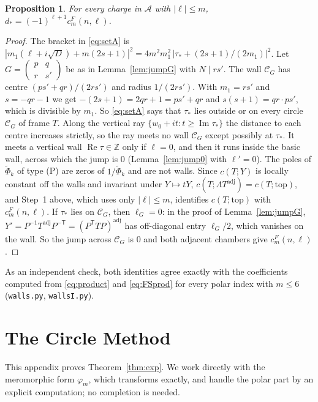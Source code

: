 \documentclass[11pt]{amsart}
\numberwithin{equation}{section}
\theoremstyle{plain}
\newtheorem{prop}[thm]{Proposition}
\theoremstyle{definition}
\theoremstyle{remark}
\newcommand{\Z}{\mathbb{Z}}
\newcommand{\cA}{\mathcal{A}}
\newcommand{\tPhi}{\widetilde{\Phi}}
\newcommand{\sm}[4]{\left(\begin{smallmatrix}#1&#2\\#3&#4\end{smallmatrix}\right)}
\begin{document}
\begin{prop}\label{prop:dstarA}
For every charge in $\cA$ with $|\ell|\le m$, $d_*=(-1)^{\ell+1}c^F_m(n,\ell)$.
\end{prop}

\begin{proof}
The bracket in \eqref{eq:setA} is $|m_1(\ell+i\sqrt D)+m(2s+1)|^2=4m^2m_1^2\,|\tau_*+(2s+1)/(2m_1)|^2$. Let $G=\sm pq{r}{s'}$ be as in Lemma~\ref{lem:jumpG} with $N\mid rs'$. The wall $\mathcal C_G$ has centre $(ps'+qr)/(2rs')$ and radius $1/(2rs')$. With $m_1=rs'$ and $s=-qr-1$ we get $-(2s+1)=2qr+1=ps'+qr$ and $s(s+1)=qr\cdot ps'$, which is divisible by $m_1$. So \eqref{eq:setA} says that $\tau_*$ lies outside or on every circle $\mathcal C_G$ of frame $T$. Along the vertical ray $\{w_0+it:t\ge\operatorname{Im}\tau_*\}$ the distance to each centre increases strictly, so the ray meets no wall $\mathcal C_G$ except possibly at $\tau_*$. It meets a vertical wall $\operatorname{Re}\tau\in\Z$ only if $\ell=0$, and then it runs inside the basic wall, across which the jump is $0$ (Lemma~\ref{lem:jump0} with $\ell'=0$). The poles of $\tPhi_k$ of type (P) are zeros of $1/\tPhi_k$ and are not walls. Since $c(T;Y)$ is locally constant off the walls and invariant under $Y\mapsto tY$, $c(T;\Lambda T^{\mathrm{adj}})=c(T;\text{top})$, and Step~1 above, which uses only $|\ell|\le m$, identifies $c(T;\text{top})$ with $c^F_m(n,\ell)$. If $\tau_*$ lies on $\mathcal C_G$, then $\ell_G=0$: in the proof of Lemma~\ref{lem:jumpG}, $Y'=P^{-1}T^{\mathrm{adj}}P^{-\mathsf T}=(P^{\mathsf T}TP)^{\mathrm{adj}}$ has off-diagonal entry $\ell_G/2$, which vanishes on the wall. So the jump across $\mathcal C_G$ is $0$ and both adjacent chambers give $c^F_m(n,\ell)$.
\end{proof}

\medskip
As an independent check, both identities agree exactly with the coefficients computed from \eqref{eq:product} and \eqref{eq:FSprod} for every polar index with $m\le6$ (\texttt{walls.py}, \texttt{wallsI.py}).
\section{The Circle Method}\label{app:circle}

This appendix proves Theorem~\ref{thm:exp}. We work directly with the meromorphic form $\varphi_m$, which transforms exactly, and handle the polar part by an explicit computation; no completion is needed.
\end{document}
